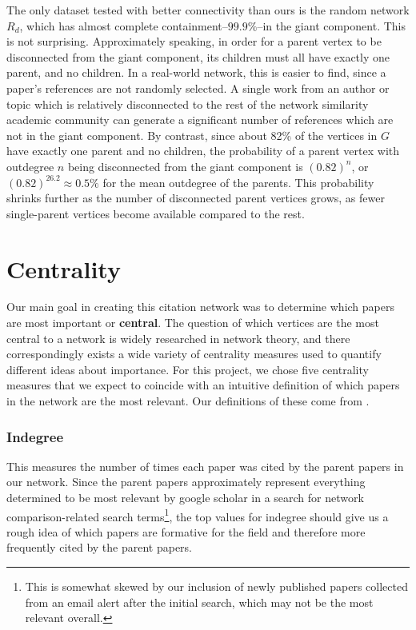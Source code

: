 \documentclass[12pt]{thesis}
\theoremstyle{plain}
\theoremstyle{definition}
\theoremstyle{remark}
\begin{document}
The only dataset tested with better connectivity than ours is the random network $R_d$, which has almost complete containment--$99.9\%$--in the giant component. This is not surprising. Approximately speaking, in order for a parent vertex to be disconnected from the giant component, its children must all have exactly one parent, and no children.  In a real-world network, this is easier to find, since a paper's references are not randomly selected. A single work from an author or topic which is relatively disconnected to the rest of the network similarity academic community can generate a significant number of references which are not in the giant component. By contrast, since about 82\% of the vertices in $G$ have exactly one parent and no children, the probability of a parent vertex with outdegree $n$ being disconnected from the giant component is $(0.82)^n$, or $(0.82)^{26.2} \approx 0.5\%$ for the mean outdegree of the parents. This probability shrinks further as the number of disconnected parent vertices grows, as fewer single-parent vertices become available compared to the rest.








\section{Centrality}\label{section:centrality}

Our main goal in creating this citation network was to determine which papers are most important or \textbf{central}. The question of which vertices are the most central to a network is widely researched in network theory, and there correspondingly exists a wide variety of centrality measures used to quantify different ideas about importance. For this project, we chose five centrality measures that we expect to coincide with an intuitive definition of which papers in the network are the most relevant. Our definitions of these come from \cite{newman2010}.

\subsubsection{Indegree} This measures the number of times each paper was cited by the parent papers in our network. Since the parent papers approximately represent everything determined to be most relevant by google scholar in a search for network comparison-related search terms\footnote{This is somewhat skewed by our inclusion of newly published papers collected from an email alert after the initial search, which may not be the most relevant overall.}, the top values for indegree should give us a rough idea of which papers are formative for the field and therefore more frequently cited by the parent papers.
\end{document}
